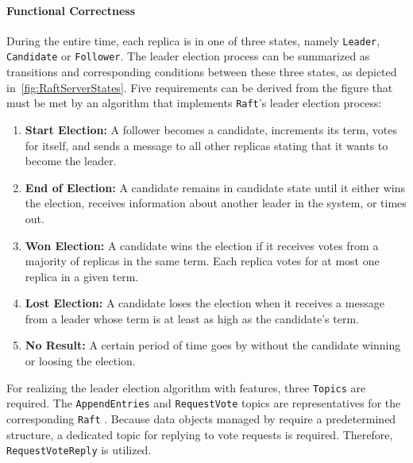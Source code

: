 \paragraph{Functional Correctness}
During the entire time, each replica is in one of three states, namely \texttt{Leader}, \texttt{Candidate} or \texttt{Follower}.
The leader election process can be summarized as transitions and corresponding conditions between these three states, as depicted in~\autoref{fig:RaftServerStates}.
Five requirements can be derived from the figure that must be met by an algorithm that implements \texttt{Raft}'s leader election process:

\begin{enumerate}
\item \textbf{Start Election:} A follower becomes a candidate, increments its term, votes for itself, and sends a message to all other replicas stating that it wants to become the leader.
\item \textbf{End of Election:} A candidate remains in candidate state until it either wins the election, receives information about another leader in the system, or times out.
\item \textbf{Won Election:} A candidate wins the election if it receives votes from a majority of replicas in the same term. Each replica votes for at most one replica in a given term.
\item \textbf{Lost Election:} A candidate loses the election when it receives a message from a leader whose term is at least as high as the candidate's term.
\item \textbf{No Result:} A certain period of time goes by without the candidate winning or loosing the election.
\end{enumerate}

For realizing the leader election algorithm with  features, three \texttt{Topics} are required.
The \texttt{AppendEntries} and \texttt{RequestVote} topics are representatives for the corresponding \texttt{Raft} .
Because data objects managed by  require a predetermined structure, a dedicated topic for replying to vote requests is required.
Therefore, \texttt{RequestVoteReply} is utilized.

